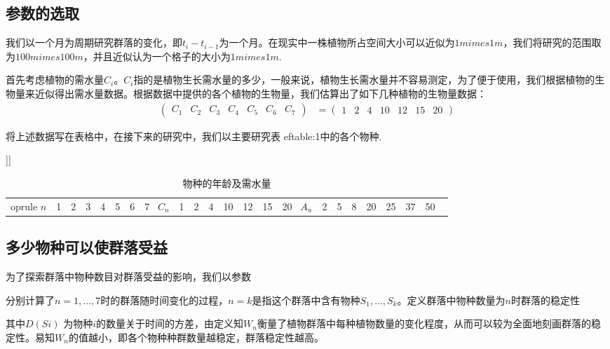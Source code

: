 \documentclass{article}
\begin{document}
\subsection{参数的选取} 我们以一个月为周期研究群落的变化，即$t_i-t_{i-1}$为一个月。在现实中一株植物所占空间大小可以近似为$1m	imes 1m$，我们将研究的范围取为$100m	imes 100m$，并且近似认为一个格子的大小为$1m	imes 1m$.

首先考虑植物的需水量$C_i$。$C_i$指的是植物生长需水量的多少，一般来说，植物生长需水量并不容易测定，为了便于使用，我们根据植物的生物量来近似得出需水量数据。根据数据中提供的各个植物的生物量，我们估算出了如下几种植物的生物量数据： \begin{align*} \begin{pmatrix} C_1 & C_2 & C_3 & C_4 & C_5 & C_6 & C_7 \end{pmatrix} &= \begin{pmatrix} 1 & 2 & 4 & 10 & 12 & 15 & 20 \end{pmatrix} \end{align*}

将上述数据写在表格中，在接下来的研究中，我们以主要研究表
ef{table:1}中的各个物种.

\begin{table}[[[failure]]]

\begin{center} \begin{tabular}{cccccccc}

	oprule $n$ & 1 & 2 & 3 & 4 & 5 & 6 & 7 \ \midrule $C_n$ & 1 & 2 & 4 & 10 & 12 & 15 & 20 \ \midrule $A_n$ & 2 & 5 & 8 & 20 & 25 & 37 & 50 \ \bottomrule \end{tabular} \caption{物种的年龄及需水量} \label{table:1} \end{center} \end{table}

\subsection{多少物种可以使群落受益}

为了探索群落中物种数目对群落受益的影响，我们以参数

分别计算了$n=1,\ldots,7$时的群落随时间变化的过程，$n=k$是指这个群落中含有物种$S_1,\ldots,S_k$。定义群落中物种数量为$n$时群落的稳定性

其中$D(Si)$ 为物种$i$的数量关于时间的方差，由定义知$W_n$衡量了植物群落中每种植物数量的变化程度，从而可以较为全面地刻画群落的稳定性。易知$W_n$的值越小，即各个物种种群数量越稳定，群落稳定性越高。
\end{document}
